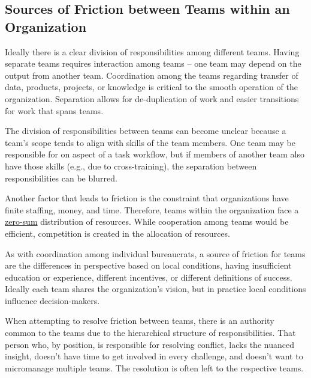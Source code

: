 \subsection*{Sources of Friction between Teams within an Organization}

Ideally there is a clear division of responsibilities among different teams. Having separate teams requires interaction among teams -- one team may depend on the output from another team. Coordination among the teams regarding transfer of data, products, projects, or knowledge is critical to the smooth operation of the organization. Separation allows for de-duplication of work and easier transitions for work that spans teams. 

The division of  responsibilities between teams can become unclear because a team's scope tends to align with skills of the team members. One team may be responsible for on aspect of a task workflow, but if members of another team also have those skills (e.g., due to cross-training), the separation between responsibilities can be blurred. 
 

Another factor that leads to friction is the constraint that organizations have finite staffing, money, and time. Therefore, teams within the organization face a \href{https://en.wikipedia.org/wiki/Zero-sum_game}{zero-sum}
distribution of resources. While cooperation among teams would be efficient, competition is created in the allocation of resources.

As with coordination among individual bureaucrats, a source of friction for teams are the differences in perspective based on local conditions, having insufficient education or experience, different incentives, or different definitions of success. Ideally each team shares the organization's vision, but in practice local conditions influence decision-makers.

When attempting to resolve friction between teams, there is an authority common to the teams due to the hierarchical structure of responsibilities. That person who, by position, is responsible for resolving conflict, lacks the nuanced insight, doesn't have time to get involved in every challenge, and doesn't want to micromanage multiple teams. The resolution is often left to the respective teams. 


